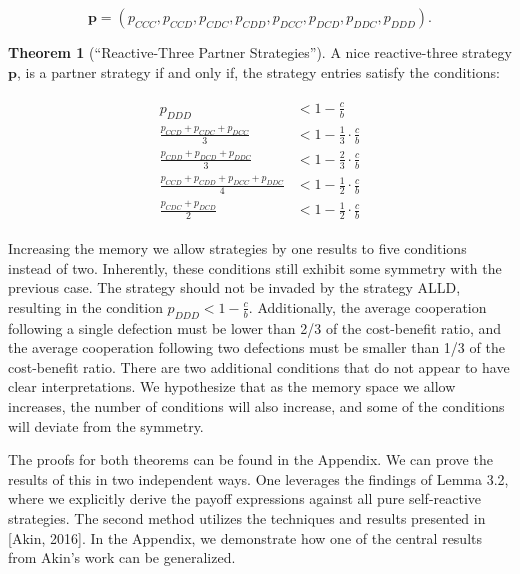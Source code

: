 \documentclass{article}
\theoremstyle{definition}
\newtheorem{theorem}{Theorem}[section]
\begin{document}
$$\mathbf{p}=(p_{CCC}, p_{CCD}, p_{CDC}, p_{CDD}, p_{DCC}, p_{DCD}, p_{DDC}, p_{DDD}).$$

\begin{theorem}[``Reactive-Three Partner Strategies'']\label{theorem:reactive_three_partner_strategies}
  A nice reactive-three strategy $\mathbf{p}$, is a partner strategy if and only if,
  the strategy entries satisfy the conditions:
  
  \begin{align}\label{eq:three_bit_conditions}
    \begin{split}
    p_{DDD} & < 1\!-\! \frac{c}{b} \\
    \frac{p_{CCD} + p_{CDC} + p_{DCC}}{3} & < 1\!-\! \frac{1}{3} \cdot \frac{c}{b} \\
    \frac{p_{CDD} + p_{DCD} + p_{DDC}}{3} & < 1\!-\! \frac{2}{3} \cdot \frac{c}{b} \\
    \frac{p_{CCD} + p_{CDD} + p_{DCC} + p_{DDC}}{4}  & < 1\!-\! \frac{1}{2} \cdot \frac{c}{b}  \\
    \frac{p_{CDC} + p_{DCD}}{2} & < 1\!-\! \frac{1}{2} \cdot \frac{c}{b}
    \end{split}
  \end{align}
\end{theorem}

Increasing the memory we allow strategies by one results to five conditions instead
of two. Inherently, these conditions still exhibit some symmetry with the
previous case. The strategy should not be invaded by the strategy ALLD,
resulting in the condition $p_{DDD} < 1 - \frac{c}{b}$. Additionally, the
average cooperation following a single defection must be lower than 2/3 of the
cost-benefit ratio, and the average cooperation following two defections must be
smaller than 1/3 of the cost-benefit ratio. There are two additional conditions
that do not appear to have clear interpretations. We hypothesize that as the
memory space we allow increases, the number of conditions will also increase,
and some of the conditions will deviate from the symmetry.

The proofs for both theorems can be found in the Appendix. We can prove the
results of this in two independent ways. One leverages the findings of Lemma
3.2, where we explicitly derive the payoff expressions against all pure
self-reactive strategies. The second method utilizes the techniques and results
presented in [Akin, 2016]. In the Appendix, we demonstrate how one of the
central results from Akin's work can be generalized.
\end{document}

